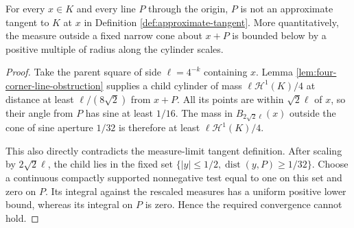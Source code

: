 \begin{proposition}\label{prop:four-corner-no-tangent}
For every $x\in K$ and every line $P$ through the origin, $P$ is not an approximate tangent to $K$ at $x$ in Definition \ref{def:approximate-tangent}. More quantitatively, the measure outside a fixed narrow cone about $x+P$ is bounded below by a positive multiple of radius along the cylinder scales.
\end{proposition}
\begin{proof}
Take the parent square of side $\ell=4^{-k}$ containing $x$. Lemma \ref{lem:four-corner-line-obstruction} supplies a child cylinder of mass $\ell\mathcal H^1(K)/4$ at distance at least $\ell/(8\sqrt2)$ from $x+P$. All its points are within $\sqrt2\ell$ of $x$, so their angle from $P$ has sine at least $1/16$. The mass in $B_{2\sqrt2\ell}(x)$ outside the cone of sine aperture $1/32$ is therefore at least $\ell\mathcal H^1(K)/4$.

This also directly contradicts the measure-limit tangent definition. After scaling by $2\sqrt2\ell$, the child lies in the fixed set $\{|y|\le1/2,\operatorname{dist}(y,P)\ge1/32\}$. Choose a continuous compactly supported nonnegative test equal to one on this set and zero on $P$. Its integral against the rescaled measures has a uniform positive lower bound, whereas its integral on $P$ is zero. Hence the required convergence cannot hold.
\end{proof}


